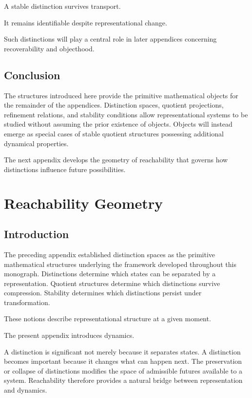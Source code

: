 \documentclass[11pt,oneside,openany]{book}
\begin{document}
A stable distinction survives transport.

It remains identifiable despite representational change.

Such distinctions will play a central role in later appendices concerning recoverability and objecthood.

\section{Conclusion}

The structures introduced here provide the primitive mathematical objects for the remainder of the appendices. Distinction spaces, quotient projections, refinement relations, and stability conditions allow representational systems to be studied without assuming the prior existence of objects. Objects will instead emerge as special cases of stable quotient structures possessing additional dynamical properties.

The next appendix develops the geometry of reachability that governs how distinctions influence future possibilities.

\chapter{Reachability Geometry}

\section{Introduction}

The preceding appendix established distinction spaces as the primitive mathematical structures underlying the framework developed throughout this monograph. Distinctions determine which states can be separated by a representation. Quotient structures determine which distinctions survive compression. Stability determines which distinctions persist under transformation.

These notions describe representational structure at a given moment.

The present appendix introduces dynamics.

A distinction is significant not merely because it separates states. A distinction becomes important because it changes what can happen next. The preservation or collapse of distinctions modifies the space of admissible futures available to a system. Reachability therefore provides a natural bridge between representation and dynamics.
\end{document}
